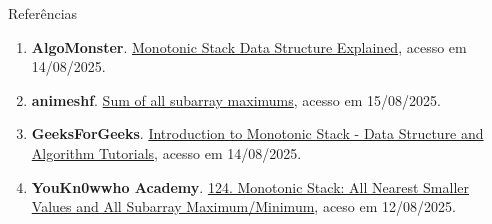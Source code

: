 \begin{frame}[fragile]{Referências}

    \begin{enumerate}
        \item \textbf{AlgoMonster}. \href{https://www.youtube.com/watch?v=Dq_ObZwTY_Q}{Monotonic Stack Data Structure Explained}, acesso em 14/08/2025.

        \item \textbf{animeshf}. \href{https://codeforces.com/blog/entry/21902?#comment-265823}{Sum of all subarray maximums}, acesso em 15/08/2025.

        \item \textbf{GeeksForGeeks}. \href{https://www.geeksforgeeks.org/dsa/introduction-to-monotonic-stack-2/}{Introduction to Monotonic Stack - Data Structure and Algorithm Tutorials}, acesso em 14/08/2025.

        \item \textbf{YouKn0wwho Academy}. \href{https://youkn0wwho.academy/topic-list/all_subarray_maximum_minimum)}{124. Monotonic Stack: All Nearest Smaller Values and All Subarray Maximum/Minimum}, aceso em 12/08/2025.
    \end{enumerate}

\end{frame}
